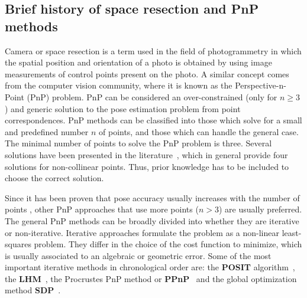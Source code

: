 \documentclass[letterpaper, 10 pt, conference]{ieeeconf}  %
\begin{document}
	\subsection{Brief history of space resection and PnP methods}
	Camera or space resection is a term used in the field of photogrammetry in which the spatial position and orientation of a photo is obtained by using image measurements of control points present on the photo. A similar concept comes from the computer vision community, where it is known as the Perspective-n-Point (PnP) problem. PnP can be considered an over-constrained (only for $n \geq 3$) and generic solution to the pose estimation problem from point correspondences. PnP methods can be classified into those which solve for a small and predefined number $n$ of points, and those which can handle the general case. The minimal number of points to solve the PnP problem is three. Several solutions have been presented in the literature~\cite{Marchand2016}, which in general provide four solutions for non-collinear points. Thus, prior knowledge has to be included to choose the correct solution. 
	
	
	Since it has been proven that pose accuracy usually increases with the number of points \cite{Marchand2016}, other PnP approaches that use more points ($n > 3$) are usually preferred. The general PnP methods can be broadly divided into whether they are iterative or non-iterative. Iterative approaches formulate the problem as a non-linear least-squares problem. They differ in the choice of the cost function to minimize, which is usually associated to an algebraic or geometric error. Some of the most important iterative methods in chronological order are: the \textbf{POSIT} algorithm~\cite{Oberkampf1996}, the \textbf{LHM}~\cite{Lu2000}, the Procrustes PnP method or \textbf{PPnP}~\cite{Garro2012} and the global optimization method \textbf{SDP}~\cite{Schweighofer2008}.
	
\end{document}
